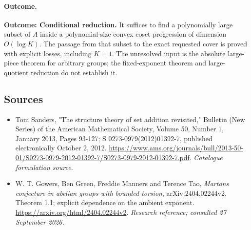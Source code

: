 \documentclass[11pt,a4paper]{article}
\numberwithin{equation}{section}
\begin{document}
\paragraph{Outcome.}
\textbf{Outcome: Conditional reduction.}
It suffices to find a polynomially large subset of $A$ inside a polynomial-size convex coset progression of dimension $O(\log K)$. The passage from that subset to the exact requested cover is proved with explicit losses, including $K=1$. The unresolved input is the absolute large-piece theorem for arbitrary groups; the fixed-exponent theorem and large-quotient reduction do not establish it.

\subsection{Sources}
\begin{itemize}\raggedright
\item[\textnormal{[S1]}]\hypertarget{source:30006785:1}{} Tom Sanders, "The structure theory of set addition revisited," Bulletin (New Series) of the American Mathematical Society, Volume 50, Number 1, January 2013, Pages 93-127; S 0273-0979(2012)01392-7, published electronically October 2, 2012.
\url{https://www.ams.org/journals/bull/2013-50-01/S0273-0979-2012-01392-7/S0273-0979-2012-01392-7.pdf}.
{\small\textit{Catalogue formulation source.}}
\item[\textnormal{[E1]}]\hypertarget{extra:30006785:1}{} W. T. Gowers, Ben Green, Freddie Manners and Terence Tao, \emph{Marton\textquotesingle s conjecture in abelian groups with bounded torsion}, arXiv:2404.02244v2, Theorem 1.1; explicit dependence on the ambient exponent.
\url{https://arxiv.org/html/2404.02244v2}.
{\small\textit{Research reference; consulted 27 September 2026.}}
\end{itemize}
\end{document}
